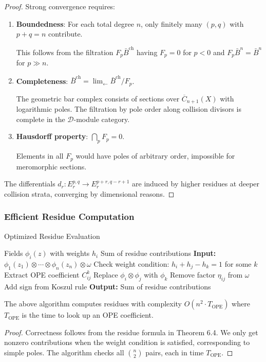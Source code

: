 \begin{proof}
Strong convergence requires:
\begin{enumerate}
\item \textbf{Boundedness}: For each total degree $n$, only finitely many $(p,q)$ with $p+q=n$ contribute.

This follows from the filtration $F_p\bar{B}^{\text{ch}}$ having $F_p = 0$ for $p < 0$ and $F_p\bar{B}^n = \bar{B}^n$ for $p \gg n$.

\item \textbf{Completeness}: $\bar{B}^{\text{ch}} = \lim_{\leftarrow} \bar{B}^{\text{ch}}/F_p$.

The geometric bar complex consists of sections over $\overline{C}_{n+1}(X)$ with logarithmic poles. The filtration by pole order along collision divisors is complete in the $\mathcal{D}$-module category.

\item \textbf{Hausdorff property}: $\bigcap_p F_p = 0$.

Elements in all $F_p$ would have poles of arbitrary order, impossible for meromorphic sections.
\end{enumerate}

The differentials $d_r: E_r^{p,q} \to E_r^{p+r,q-r+1}$ are induced by higher residues at deeper collision strata, converging by dimensional reasons.
\end{proof}

\subsubsection{Efficient Residue Computation}
 
\begin{algorithm}
\caption{Optimized Residue Evaluation}
\label{alg:residue-evaluation}
\begin{algorithmic}[1]
\Require Fields $\phi_i(z)$ with weights $h_i$
\Ensure Sum of residue contributions
\State \textbf{Input:} $\phi_1(z_1) \otimes \cdots \otimes \phi_n(z_n) \otimes \omega$
    \State Check weight condition: $h_i + h_j - h_k = 1$ for some $k$
        \State Extract OPE coefficient $C^k_{ij}$
        \State Replace $\phi_i \otimes \phi_j$ with $\phi_k$
        \State Remove factor $\eta_{ij}$ from $\omega$
        \State Add sign from Koszul rule
    \EndIf
\EndFor
\State \textbf{Output:} Sum of residue contributions
\end{algorithmic}
\end{algorithm}

 
\begin{proposition}
The above algorithm computes residues with complexity $O(n^2 \cdot T_{\text{OPE}})$ where $T_{\text{OPE}}$ is the time to look up an OPE coefficient.
\end{proposition}
 
\begin{proof}
Correctness follows from the residue formula in Theorem 6.4. We only get nonzero contributions when the weight condition is satisfied, corresponding to simple poles. The algorithm checks all $\binom{n}{2}$ pairs, each in time $T_{\text{OPE}}$.
\end{proof}
 